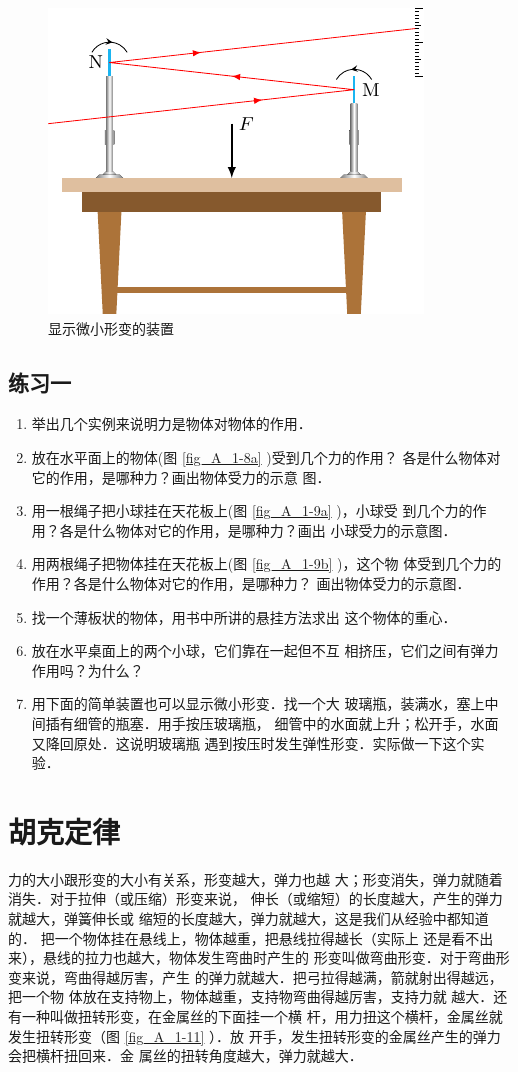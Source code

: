 \begin{figure} [htp]
\centering
\includegraphics{fig/A/1-10.pdf} 
\caption{显示微小形变的装置} \label{fig_A_1-10} 
\end{figure} 

\subsection*{练习一} 
\begin{enumerate} 
\item  举出几个实例来说明力是物体对物体的作用．
\item 放在水平面上的物体(图 \ref{fig_A_1-8a} )受到几个力的作用？
  各是什么物体对它的作用，是哪种力？画出物体受力的示意
  图．
\item 用一根绳子把小球挂在天花板上(图 \ref{fig_A_1-9a} )，小球受
  到几个力的作用？各是什么物体对它的作用，是哪种力？画出
  小球受力的示意图．
\item 用两根绳子把物体挂在天花板上(图 \ref{fig_A_1-9b} )，这个物
  体受到几个力的作用？各是什么物体对它的作用，是哪种力？
  画出物体受力的示意图．
 \item 找一个薄板状的物体，用书中所讲的悬挂方法求出
  这个物体的重心．
 \item 放在水平桌面上的两个小球，它们靠在一起但不互
相挤压，它们之间有弹力作用吗？为什么？
\item 用下面的简单装置也可以显示微小形变．找一个大
玻璃瓶，装满水，塞上中间插有细管的瓶塞．用手按压玻璃瓶，
细管中的水面就上升；松开手，水面又降回原处．这说明玻璃瓶
遇到按压时发生弹性形变．实际做一下这个实验．
\end{enumerate} 

\section{胡克定律} 
力的大小跟形变的大小有关系，形变越大，弹力也越
大；形变消失，弹力就随着消失．对于拉伸（或压缩）形变来说，
伸长（或缩短）的长度越大，产生的弹力就越大，弹簧伸长或
缩短的长度越大，弹力就越大，这是我们从经验中都知道的．
把一个物体挂在悬线上，物体越重，把悬线拉得越长（实际上
还是看不出来），悬线的拉力也越大，物体发生弯曲时产生的
形变叫做弯曲形变．对于弯曲形变来说，弯曲得越厉害，产生
的弹力就越大．把弓拉得越满，箭就射出得越远，把一个物
体放在支持物上，物体越重，支持物弯曲得越厉害，支持力就
越大．还有一种叫做扭转形变，在金属丝的下面挂一个横
杆，用力扭这个横杆，金属丝就发生扭转形变（图 \ref{fig_A_1-11} ）．放
开手，发生扭转形变的金属丝产生的弹力会把横杆扭回来．金
属丝的扭转角度越大，弹力就越大．

